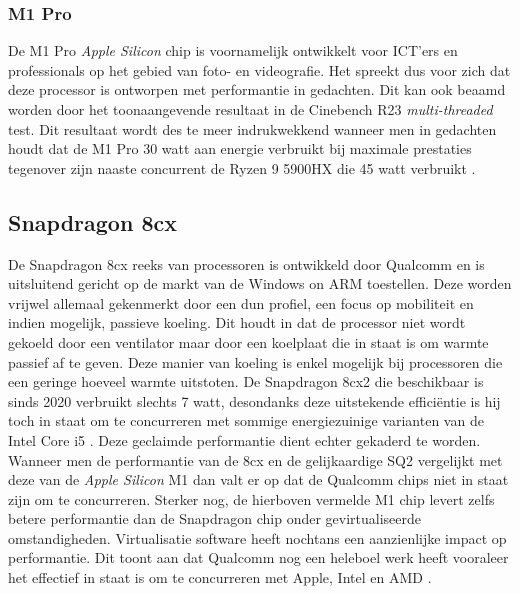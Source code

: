 \subsubsection{M1 Pro}
\raggedbottom
De M1 Pro \textit{Apple Silicon} chip is voornamelijk ontwikkelt voor ICT'ers en professionals op het gebied van foto- en videografie. Het spreekt dus voor zich dat deze processor is ontworpen met performantie in gedachten. Dit kan ook beaamd worden door het toonaangevende resultaat in de Cinebench R23 \textit{multi-threaded} test. Dit resultaat wordt des te meer indrukwekkend wanneer men in gedachten houdt dat de M1 Pro 30 watt aan energie verbruikt bij maximale prestaties tegenover zijn naaste concurrent de Ryzen 9 5900HX die 45 watt verbruikt \autocite{Schiesser2021}.

\subsection{Snapdragon 8cx}
\raggedbottom
De Snapdragon 8cx reeks van processoren is ontwikkeld door Qualcomm en is uitsluitend gericht op de markt van de Windows on ARM toestellen. Deze worden vrijwel allemaal gekenmerkt door een dun profiel, een focus op mobiliteit en indien mogelijk, passieve koeling. Dit houdt in dat de processor niet wordt gekoeld door een ventilator maar door een koelplaat die in staat is om warmte passief af te geven. Deze manier van koeling is enkel mogelijk bij processoren die een geringe hoeveel warmte uitstoten. De Snapdragon 8cx2 die beschikbaar is sinds 2020 verbruikt slechts 7 watt, desondanks deze uitstekende efficiëntie is hij toch in staat om te concurreren met sommige energiezuinige varianten van de Intel Core i5 \autocite{Qualcomm2020}. Deze geclaimde performantie dient echter gekaderd te worden. Wanneer men de performantie van de 8cx en de gelijkaardige SQ2 vergelijkt met deze van de \textit{Apple Silicon} M1 dan valt er op dat de Qualcomm chips niet in staat zijn om te concurreren. Sterker nog, de hierboven vermelde M1 chip levert zelfs betere performantie dan de Snapdragon chip onder gevirtualiseerde omstandigheden. Virtualisatie software heeft nochtans een aanzienlijke impact op performantie. Dit toont aan dat Qualcomm nog een heleboel werk heeft vooraleer het effectief in staat is om te concurreren met Apple, Intel en AMD \autocite{Wankhede2020}.


